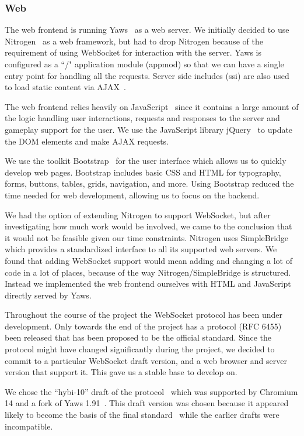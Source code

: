\documentclass[11pt,a4paper]{report}
\begin{document}
\subsubsection{Web}
The web frontend is running Yaws~\cite{yaws} as a web server.
We initially decided to use Nitrogen~\cite{nitrogen} as a web framework,
but had to drop Nitrogen because of the requirement of using WebSocket for
interaction with the server. Yaws is configured as a ``/" application
module (appmod) so that we can have a single entry point for handling all the
requests. Server side includes (ssi) are also used to load static content via
AJAX~\cite{ajax}.

The web frontend relies heavily on JavaScript~\cite{javascript} since it contains
a large amount of the logic handling user interactions, requests and responses
to the server and gameplay support for the user. We use the JavaScript library
jQuery~\cite{jquery} to update the DOM elements and make AJAX requests.

We use the toolkit Bootstrap~\cite{bootstrap} for the user interface which
allows us to quickly develop web pages. Bootstrap includes basic CSS and HTML for
typography, forms, buttons, tables, grids, navigation, and more. Using Bootstrap
reduced the time needed for web development, allowing us to focus on the
backend.

We had the option of extending Nitrogen to support WebSocket, but after
investigating how much work would be involved, we came to the conclusion that it
would not be feasible given our time constraints. Nitrogen uses
SimpleBridge~\cite{simple_bridge} which provides a standardized interface to all
its supported web servers. We found that adding WebSocket support would mean
adding and changing a lot of code in a lot of places, because of the way
Nitrogen/SimpleBridge is structured. Instead we implemented the web frontend
ourselves with HTML and JavaScript directly served by Yaws.

Throughout the course of the project the WebSocket protocol has
been under development. Only towards the end of the project has a protocol
(RFC 6455) been released that has been proposed to be the official standard.
Since the protocol might have changed significantly during the project, we
decided to commit to a particular WebSocket draft version, and a web browser and
server version that support it. This gave us a stable base to develop on.

We chose the ``hybi-10'' draft of the protocol~\cite{hybi-10} which was
supported by Chromium 14 and a fork of Yaws 1.91~\cite{yaws-fork}. This draft
version was chosen because it appeared likely to become the basis of the final
standard~\cite{new-websocket-google-blog} while the earlier drafts were
incompatible.
\end{document}
